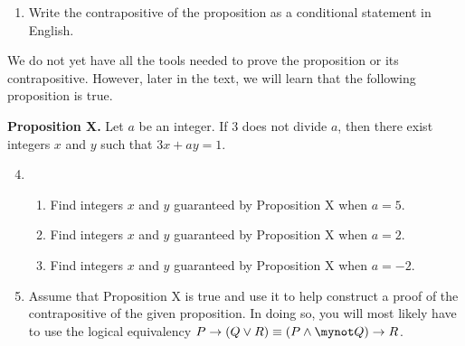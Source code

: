 \begin{enumerate}
\begin{enumerate}
  \item Write the contrapositive of the proposition as a conditional statement in English.
\end{enumerate}

We do not yet have all the tools needed to prove the proposition or its contrapositive.  However, later in the text, we will learn that the following proposition is true.

\begin{flushleft}
\textbf{Proposition X.}
Let  $a$  be an integer.  If  3  does not divide  $a$, then there exist integers  $x$  and  $y$  such that  $3x + ay = 1$.
\end{flushleft}

\begin{enumerate}
\setcounter{enumii}{3}
  \item \begin{enumerate} \item Find  integers  $x$  and  $y$  guaranteed by Proposition X when  $a = 5$.
      \item Find  integers  $x$  and  $y$  guaranteed by Proposition X when  $a = 2$.
      \item Find  integers  $x$  and  $y$  guaranteed by Proposition X when  $a =  - 2$.
      \end{enumerate}

  \item Assume that Proposition  X  is true and use it to help construct a proof of the contrapositive of the given proposition.  In doing so, you will most likely have to use the logical equivalency $P \to \left( {Q \vee R} \right) \equiv \left( {P \wedge \mynot  Q} \right) \to R$.

\end{enumerate}

\end{enumerate}





\hbreak


\endinput

